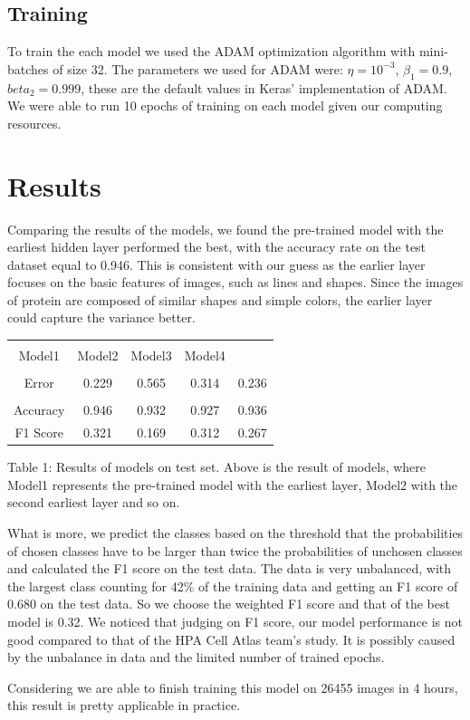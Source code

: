 \documentclass{article}
\begin{document}
\subsection{Training}
To train the each model we used the ADAM optimization algorithm\cite{kingma2014adam} with mini-batches of size 32.
The parameters we used for ADAM were: $\eta = 10^{-3}$, $\beta_1 = 0.9$, $beta_2=0.999$, these
are the default values in Keras' implementation of ADAM.
We were able to run 10 epochs of training on each model given our computing resources. 
\section{Results}
Comparing the results of the models, we found the pre-trained model with the earliest hidden layer performed the best, with the accuracy rate on the test dataset equal to 0.946. This is consistent with our guess as the earlier layer focuses on the basic features of images, such as lines and shapes. Since the images of protein are composed of similar shapes and simple colors, the earlier layer could capture the variance better. 

\begin{table}[h!]
\centering

\begin{tabular}{|c|c|c|c|c|}
    \hline\\
     Model1 & Model2&Model3&Model4 \\
     \hline\\
     Error&0.229&0.565&0.314&0.236\\
     \hline\\
     Accuracy&0.946&0.932&0.927&0.936\\
      \hline
     F1 Score&0.321&0.169&0.312&0.267\\
     \hline
\end{tabular}

{\raggedright Table 1: Results of models on test set. Above is the result of models, where Model1 represents the pre-trained model with the earliest layer, Model2 with the second earliest layer and so on. \par}

\label{table:1}
\end{table}

What is more, we predict the classes based on the threshold that the probabilities of chosen classes have to be larger than twice the probabilities of unchosen classes and calculated the F1 score on the test data. The data is very unbalanced, with the largest class counting for 42\% of the training data and getting an F1 score of 0.680 on the test data. So we choose the weighted F1 score and that of the best model is 0.32. We noticed that judging on F1 score, our model performance is not good compared to that of the HPA Cell Atlas team's study. It is possibly caused by the unbalance in data and the limited number of trained epochs.

Considering we are able to finish training this model on 26455 images in 4 hours, this result is pretty applicable in practice.

\newpage


\end{document}
